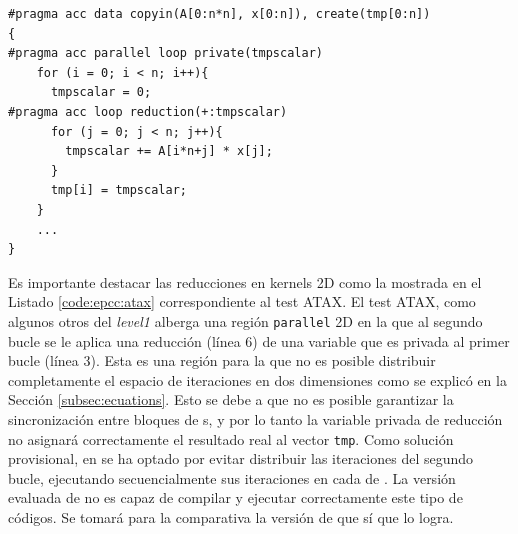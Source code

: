 \begin{lstlisting}[caption={Test ATAX del level1},label=code:epcc:atax]
#pragma acc data copyin(A[0:n*n], x[0:n]), create(tmp[0:n])
{
#pragma acc parallel loop private(tmpscalar)
    for (i = 0; i < n; i++){
      tmpscalar = 0;
#pragma acc loop reduction(+:tmpscalar)
      for (j = 0; j < n; j++){
        tmpscalar += A[i*n+j] * x[j];
      }
      tmp[i] = tmpscalar;
    }
    ...
}
\end{lstlisting}

Es importante destacar las reducciones en kernels 2D como 
la mostrada en el Listado \ref{code:epcc:atax} correspondiente al test ATAX. 
El test ATAX, como algunos 
otros del \textit{level1} alberga una región \texttt{parallel} 2D en la que al segundo 
bucle se le aplica una reducción (línea 6) de una variable que es privada al primer bucle 
(línea 3). Esta es una región para la que no es posible distribuir completamente el 
espacio de iteraciones en dos dimensiones como se explicó en la Sección 
\ref{subsec:ecuations}. Esto se debe a que no es posible garantizar la sincronización
entre bloques de \thread{}s, y por lo tanto la variable privada de reducción no asignará
correctamente el resultado real al vector \texttt{tmp}. Como solución provisional,
en \accULL{} se ha optado por evitar distribuir las iteraciones del segundo bucle, 
ejecutando secuencialmente sus iteraciones en cada \thread{} de \gpu{}. La versión 
evaluada de \CAPS{} no es 
capaz de compilar y ejecutar correctamente este tipo de códigos. Se tomará para la 
comparativa la versión de \PGI{} que sí que lo logra.


